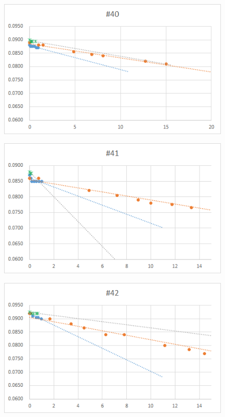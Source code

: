   \begin{figure}[htbp]
    \centering
       \includegraphics[width=120mm]{vol_040.png}
  \end{figure}
  \begin{figure}[htbp]
    \centering
       \includegraphics[width=120mm]{vol_041.png}
  \end{figure}
  \begin{figure}[htbp]
    \centering
       \includegraphics[width=120mm]{vol_042.png}
  \end{figure}
